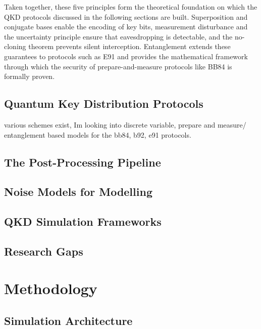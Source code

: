 \documentclass[10pt, a4paper]{report}
\begin{document}
Taken together, these five principles form the theoretical foundation on which the QKD protocols discussed in the following sections are built. Superposition and conjugate bases enable the encoding of key bits, measurement disturbance and the uncertainty principle ensure that eavesdropping is detectable, and the no-cloning theorem prevents silent interception. Entanglement extends these guarantees to protocols such as E91 and provides the mathematical framework through which the security of prepare-and-measure protocols like BB84 is formally proven.

\section{Quantum Key Distribution Protocols}

various schemes exist, Im looking into discrete variable, prepare and measure/ entanglement based models for the bb84, b92, e91 protocols. 

\section{The Post-Processing Pipeline}

\section{Noise Models for Modelling} 

\section{QKD Simulation Frameworks}

\section{Research Gaps}

\chapter{Methodology}

\section{Simulation Architecture}
\end{document}
